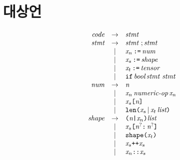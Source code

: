 \documentclass{article}
\begin{document}
\section{대상언}
\begin{Large}
  \[\begin{array}{lcrclr}
  && \textit{code} & \rightarrow & \textit{stmt} & \\
  && \textit{stmt} & \rightarrow & \textit{stmt} \ ; \textit{stmt} & \\
  &&          & | & \textit{x}_{n} \, \texttt{:=} \, \textit{num} & \\
  &&          & | & \textit{x}_{s}\, \texttt{:=} \, \textit{shape} & \\
  &&          & | & \textit{x}_{t}\, \texttt{:=} \, \textit{tensor} & \\
  &&          & | & \texttt{if} \, \textit{bool} \, \textit{stmt stmt}& \\
  && \textit{num} & \rightarrow & \textit{n} & \\
  &&          & | & \textit{x}_{n} \, \textit{numeric-op} \, \textit{x}_{n} & \\
  &&          & | & \textit{x}_{s}\texttt{[}\textit{n}\texttt{]} & \\
  &&          & | & \texttt{len(} \textit{x}_{s} \, | \, \textit{x}_{t}\,\textit{list} \texttt{)} & \\
  && \textit{shape} & \rightarrow & \texttt{(} \textit{n} \texttt{|} \textit{x}_{n} \texttt{)} \textit{list} & \\
  &&          & | & \textit{x}_{s}\texttt{[}\textit{n}^{?}\texttt{:}\,\textit{n}^{?}\texttt{]} & \\
  &&          & | & \texttt{shape}\texttt{(}\textit{x}_{t}\texttt{)} & \\
  &&          & | & \textit{x}_{s} \texttt{++} \textit{x}_{s} & \\
  &&          & | & \textit{x}_{n} \texttt{::} \textit{x}_{s} & \\
\end{array}\] \\
\end{Large}
\end{document}
